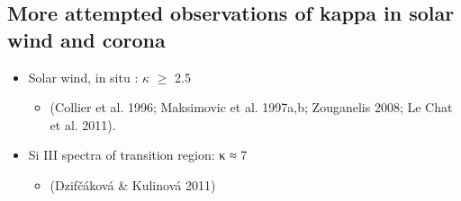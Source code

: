 \documentclass[11pt]{article}
\begin{document}
\subsection{More attempted observations of kappa in solar wind and corona}
\label{sec:orgheadline7}
\begin{itemize}
\item Solar wind, in  situ : \(\kappa\) \(\ge\) 2.5
\begin{itemize}
\item (Collier et al. 1996; Maksimovic et al. 1997a,b; Zouganelis 2008; Le Chat et al. 2011).
\end{itemize}
\item Si III spectra of transition region: κ ≈ 7
\begin{itemize}
\item (Dzifčáková \& Kulinová 2011)
\end{itemize}
\end{itemize}
\end{document}
